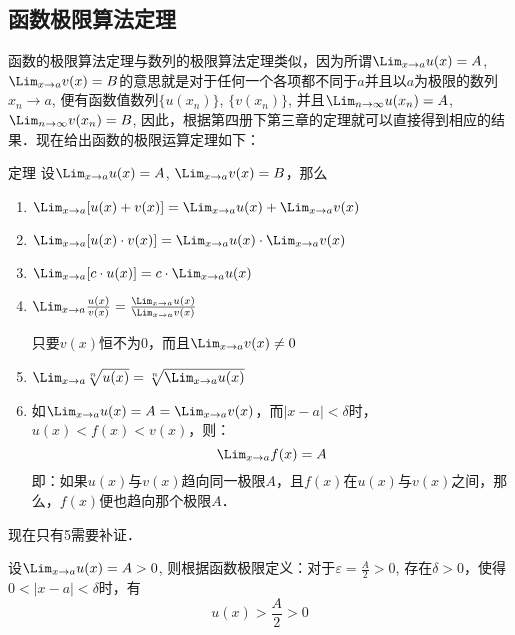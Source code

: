 \subsection{函数极限算法定理}
函数的极限算法定理与数列的极限算法定理类似，因为所谓$\Lim_{x\to a}u(x)=A$, $\Lim_{x\to a}v(x)=B$的意思就是对于任何一个各项都不同于$a$并且以$a$为极限的数列$x_n\to a$, 便有函数值数列$\{u(x_n)\}$, $\{v(x_n)\}$, 并且$\Lim_{n\to \infty}u(x_n)=A$, 
$\Lim_{n\to \infty} v(x_n)=B$, 因此，根据第四册下第三章的定理就可以直接得到相应的结果．现在给出函数的极限运算定理如下：

\begin{blk}{定理}
设$\Lim_{x\to a}u(x)=A$, $\Lim_{x\to a}v(x)=B$，那么
\begin{enumerate}
    \item $\Lim_{x\to a}[u(x)+v(x)]=\Lim_{x\to a}u(x)+\Lim_{x\to a}v(x)$
    \item $\Lim_{x\to a}[u(x)\cdot v(x)]=\Lim_{x\to a} u(x)\cdot \Lim_{x\to a}v(x)$
    \item $\Lim_{x\to a}[c\cdot u(x)]=c\cdot \Lim_{x\to a}u(x)$
    \item $\Lim_{x\to a}\frac{u(x)}{v(x)}=\frac{\Lim_{x\to a}u(x)}{\Lim_{x\to a}v(x)}$ 
    
    只要$v(x)$恒不为0，而且$\Lim_{x\to a}v(x)\ne 0$
    \item $\Lim_{x\to a}\sqrt[n]{u(x)}=\sqrt[n]{\Lim_{x\to a}u(x)}$
    \item 如$\Lim_{x\to a}u(x)=A=\Lim_{x\to a} v(x)$，而$|x-a|<\delta$时，$u(x)<f(x)<v(x)$，则：
    \[\Lim_{x\to a} f(x)=A\]
    即：如果$u(x)$与$v(x)$趋向同一极限$A$，且$f(x)$在$u(x)$与$v(x)$之间，那么，$f(x)$便也趋向那个极限$A$．
\end{enumerate}
\end{blk}

现在只有5需要补证．

设$\Lim_{x\to a}u(x)=A>0$, 则根据函数极限定义：对于$\varepsilon=\frac{A}{2}>0$, 存在$\delta>0$，使得$0<|x-a|<\delta$时，有
\begin{equation}
    u(x)>\frac{A}{2}>0
\end{equation}

